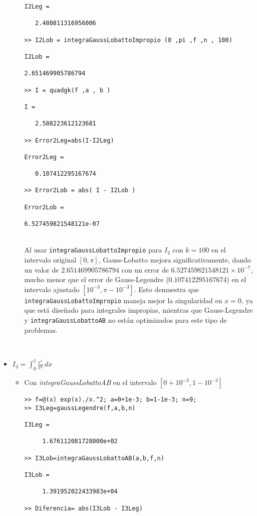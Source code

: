 \documentclass[a4paper]{article}
\begin{document}
\begin{itemize}
\begin{itemize}
\begin{lstlisting}[frame=single, style=Matlab-Pyglike]
I2Leg =

   2.480811316956006

>> I2Lob = integraGaussLobattoImpropio (0 ,pi ,f ,n , 100)

I2Lob =

2.651469905786794

>> I = quadgk(f ,a , b )

I =

   2.588223612123681

>> Error2Leg=abs(I-I2Leg)

Error2Leg =

   0.107412295167674

>> Error2Lob = abs( I - I2Lob )

Error2Lob =

6.527459821548121e-07
\end{lstlisting}
\\
Al usar \texttt{integraGaussLobattoImpropio} para \( I_2 \) con \( k = 100 \) en el intervalo original \( [0, \pi] \), Gauss-Lobatto mejora significativamente, dando un valor de \( 2.651469905786794 \) con un error de \( 6.527459821548121 \times 10^{-7} \), mucho menor que el error de Gauss-Legendre (\( 0.107412295167674 \)) en el intervalo ajustado \( [10^{-3}, \pi - 10^{-3}] \). Esto demuestra que \texttt{integraGaussLobattoImpropio} maneja mejor la singularidad en \( x = 0 \), ya que está diseñado para integrales impropias, mientras que Gauss-Legendre y \texttt{integraGaussLobattoAB} no están optimizados para este tipo de problemas.
\end{itemize}
\\
\item $\displaystyle I_3=\int_{0}^{1} \! \frac{e^x}{x^2}  \,dx$
\\
\begin{itemize}
    \item Con \textit{integraGaussLobattoAB} en el intervalo $[0+10^{-3},1-10^{-3}]$
    \\
    \begin{lstlisting}[frame=single, style=Matlab-Pyglike]
>> f=@(x) exp(x)./x.^2; a=0+1e-3; b=1-1e-3; n=9;
>> I3Leg=gaussLegendre(f,a,b,n)

I3Leg =

     1.676112081728000e+02

>> I3Lob=integraGaussLobattoAB(a,b,f,n)

I3Lob =

     1.391952022433983e+04

>> Diferencia= abs(I3Lob - I3Leg)


\end{lstlisting}
\end{itemize}
\end{itemize}
\end{document}
